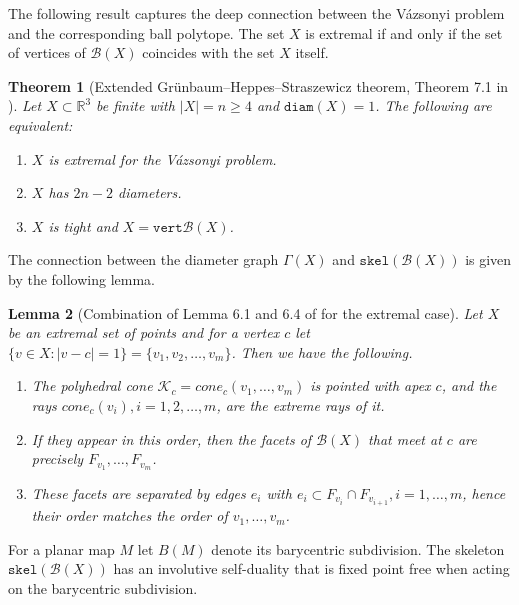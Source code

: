 \documentclass{article}
\newtheorem{theorem}{Theorem}[section]
\newtheorem{lemma}[theorem]{Lemma}
\newcommand{\R}[0]{\mathbb{R}}
\newcommand{\Kc}[0]{\mathcal{K}}
\newcommand{\Bc}[0]{\mathcal{B}}
\newcommand{\skel}[0]{\mathtt{skel}}
\newcommand{\diam}[0]{\mathtt{diam}}
\newcommand{\vertices}[0]{\mathtt{vert}}
\newcommand{\cone}[0]{cone}
\begin{document}
The following result captures the deep connection between the Vázsonyi problem and the corresponding ball polytope. The set $X$ is extremal if and only if the set of vertices of $\Bc(X)$ coincides with the set $X$ itself. 

\begin{theorem}[Extended Grünbaum--Heppes--Straszewicz theorem, Theorem 7.1 in \cite{kupitz2010ball}]\label{thm:extendedghs}
Let \(X\subset\R^3\) be finite with \(|X|=n\geq 4\) and \(\diam(X)=1\).  The
following are equivalent:
\begin{enumerate}[label=\textup{(\roman*)}]
    \item \(X\) is extremal for the Vázsonyi problem.
    \item $X$ has $2n-2$ diameters.
    \item \(X\) is tight and $X=\vertices \Bc(X)$.
    
\end{enumerate}
\end{theorem}



The connection between the diameter graph $\Gamma(X)$ and $\skel(\Bc(X))$ is given by the following lemma. 

\begin{lemma}[Combination of Lemma 6.1 and 6.4 of \cite{kupitz2010ball} for the extremal case]\label{lem:precise}
    Let $X$ be an extremal set of points and for a vertex $c$ let $\{v \in X : |v - c| = 1\} = \{v_1, v_2,\dots , v_m\}$. Then we have the following. 
    \begin{enumerate}
        \item[a)]  The polyhedral cone $\Kc_c=\cone_c(v_1, \dots , v_m)$ is pointed with apex $c$, and the rays $\cone_c(v_i), i = 1, 2, \dots , m$, are the extreme rays of it.
        \item[b)] If they appear in this order, then the facets of $\Bc(X)$ that meet at $c$ are precisely     \(F_{v_1},\ldots,F_{v_m}\).
        \item[c)] These facets are separated by edges $e_i$ with $e_i \subset F_{v_i}\cap F_{v_{i+1}} , i = 1, \dots , m$, hence their order matches the order of $v_1,\dots, v_m$.
    \end{enumerate}
    

\end{lemma}

For a planar map $M$ let $B(M)$ denote its barycentric subdivision. The skeleton $\skel(\Bc(X))$ has an involutive self-duality that is fixed point free when acting on the barycentric subdivision.
\end{document}
